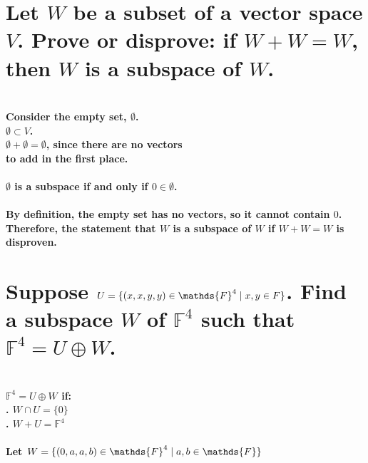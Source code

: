 \documentclass{article}
\begin{document}
\newpage

\section{Let $W$ be a subset of a vector space $V$. Prove or disprove: if $W + W = W$, then $W$ is a subspace of $W$.}

\paragraph{\large
\\Consider the empty set, $\emptyset$.
\\\indent $\emptyset \subset V$.
\\\indent $\emptyset + \emptyset = \emptyset$, since there are no vectors
\\\indent to add in the first place.}

\paragraph{\large
$\emptyset$ is a subspace if and only if $0 \in \emptyset$.}

\paragraph{\large
By definition, the empty set has no vectors, so it cannot contain $0$. Therefore, the statement that $W$ is a subspace of $W$ if $W + W = W$ is disproven.}

\newpage

\section{Suppose $U = \{(x, x, y, y) \in \mathds{F}^{4} \thickspace | \thickspace x, y \in F\}$. Find a subspace $W$ of $\mathds{F}^{4}$ such that $\mathds{F}^{4} = U \oplus W$.}

\paragraph{\large
\\$\mathds{F}^{4} = U \oplus W$ if:
\\. $W \cap U = \{0\}$
\\. $W + U = \mathds{F}^{4}$}

\paragraph{\large
Let $W = \{(0, a, a, b) \in \mathds{F}^{4} \thickspace | \thickspace a,b \in \mathds{F}\}$}
\end{document}

